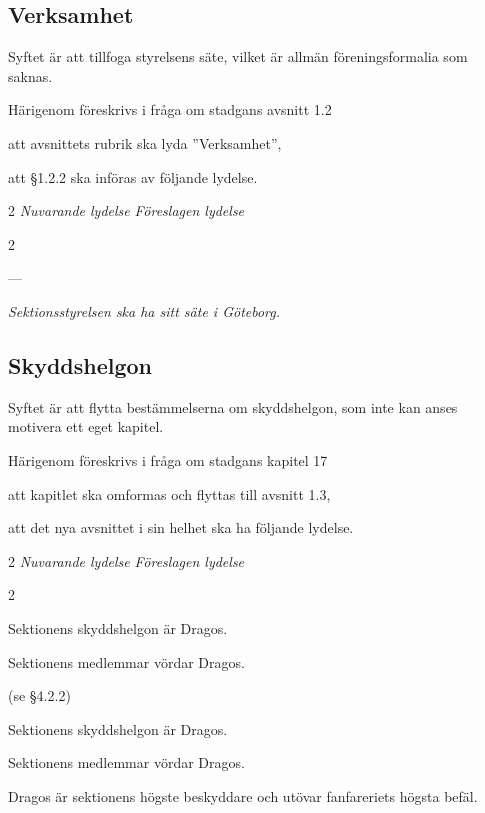 \documentclass{article}
\newenvironment{lydelse}
    {\begin{paracol}{2}%
        \emph{Nuvarande lydelse}%
        \switchcolumn%
        \emph{Föreslagen lydelse}%
    \end{paracol}%
    \begin{enumerate}[label=\thesubsection.\arabic*]%
    \begin{paracol}{2}%
    }{\end{paracol}\end{enumerate}}
\begin{document}
\subsection{Verksamhet}
Syftet är att tillfoga styrelsens säte, vilket är allmän föreningsformalia som saknas.

Härigenom föreskrivs i fråga om stadgans avsnitt 1.2
\begin{dels}
    \item att avsnittets rubrik ska lyda ''Verksamhet'',
    \item att \S 1.2.2 ska införas av följande lydelse.
\end{dels}

\begin{lydelse}
    ---
  \switchcolumn
  \setcounter{enumi}{1}
    \item \emph{Sektionsstyrelsen ska ha sitt säte i Göteborg.}
\end{lydelse}

\subsection{Skyddshelgon}
Syftet är att flytta bestämmelserna om skyddshelgon, som inte kan anses motivera ett eget kapitel.

Härigenom föreskrivs i fråga om stadgans kapitel 17
\begin{dels}
    \item att kapitlet ska omformas och flyttas till avsnitt 1.3,
    \item att det nya avsnittet i sin helhet ska ha följande lydelse.
\end{dels}

\begin{lydelse}
  \setcounter{section}{17}
  \setcounter{subsection}{1}
    \item Sektionens skyddshelgon är Dragos.
    \item Sektionens medlemmar vördar Dragos.
    \item[] (se \S 4.2.2)
  \setcounter{section}{1}
  \setcounter{subsection}{3}
  \switchcolumn   
  \setcounter{enumi}{0}
    \item Sektionens skyddshelgon är Dragos.
    \item Sektionens medlemmar vördar Dragos.
    \item Dragos är sektionens högste beskyddare och utövar fanfareriets högsta befäl.
      \label{1.3:beskyddare}
\end{lydelse}
\end{document}
